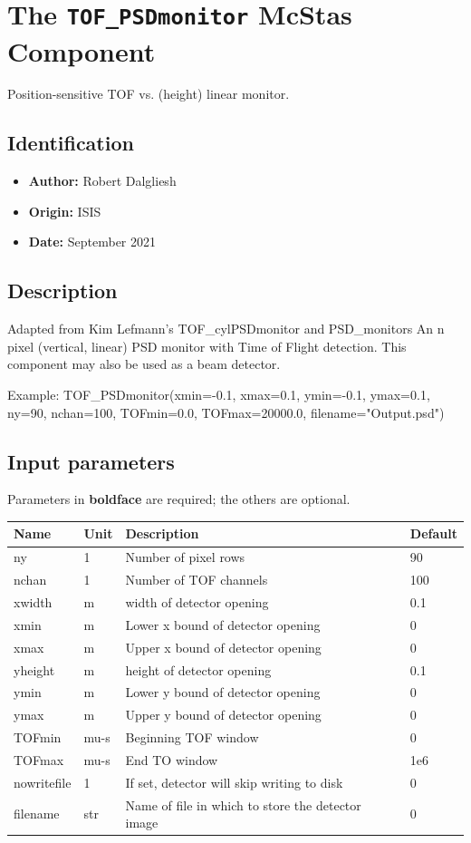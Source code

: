 \section{The \texttt{TOF\_PSDmonitor} McStas Component}
Position-sensitive TOF vs. (height) linear monitor.

\subsection*{Identification}
\begin{itemize}
  \item \textbf{Author:} Robert Dalgliesh
  \item \textbf{Origin:} ISIS
  \item \textbf{Date:} September 2021
\end{itemize}

\subsection*{Description}
Adapted from Kim Lefmann's TOF\_cylPSDmonitor and PSD\_monitors An n pixel (vertical, linear) PSD monitor with Time of Flight detection. This component may also be used as a beam detector.

Example: TOF\_PSDmonitor(xmin=-0.1, xmax=0.1, ymin=-0.1, ymax=0.1, ny=90, nchan=100, TOFmin=0.0, TOFmax=20000.0, filename="Output.psd")

\subsection*{Input parameters}
Parameters in \textbf{boldface} are required; the others are optional.

\begin{longtable}{p{}p{}p{}p{}}
\toprule
\textbf{Name} & \textbf{Unit} & \textbf{Description} & \textbf{Default} \\
\midrule
\endhead
ny & 1 & Number of pixel rows & 90 \\
nchan & 1 & Number of TOF channels & 100 \\
xwidth & m & width of detector opening & 0.1 \\
xmin & m & Lower x bound of detector opening & 0 \\
xmax & m & Upper x bound of detector opening & 0 \\
yheight & m & height of detector opening & 0.1 \\
ymin & m & Lower y bound of detector opening & 0 \\
ymax & m & Upper y bound of detector opening & 0 \\
TOFmin & mu-s & Beginning TOF window & 0 \\
TOFmax & mu-s & End TO window & 1e6 \\
nowritefile & 1 & If set, detector will skip writing to disk & 0 \\
filename & str & Name of file in which to store the detector image & 0 \\
\bottomrule
\end{longtable}

